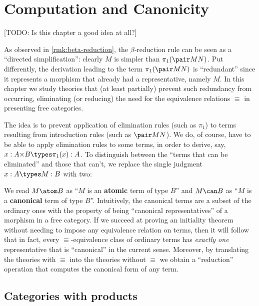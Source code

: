 \chapter{Computation and Canonicity}
\label{cha:canonical}

[TODO: Is this chapter a good idea at all?]

As observed in \cref{rmk:beta-reduction}, the $\beta$-reduction rule can be seen as a ``directed simplification'': clearly $M$ is simpler than $\pi_1(\pair M N)$.
Put differently, the derivation leading to the term $\pi_1(\pair M N)$ is ``redundant'' since it represents a morphism that already had a representative, namely $M$.
In this chapter we study theories that (at least partially) prevent such redundancy from occurring, eliminating (or reducing) the need for the equivalence relations $\equiv$ in presenting free categories.

The idea is to prevent application of elimination rules (such as $\pi_1$) to terms resulting from introduction rules (such as $\pair M N$).
We do, of course, have to be able to apply elimination rules to some terms, in order to derive, say, $x:A\times B \types \pi_1(x):A$.
To distinguish between the ``terms that can be eliminated'' and those that can't, we replace the single judgment $x:A\types M:B$ with two:
We read $M\atom B$ as ``$M$ is an \textbf{atomic} term of type $B$'' and $M\can B$ as ``$M$ is a \textbf{canonical} term of type $B$''.
Intuitively, the canonical terms are a subset of the ordinary ones with the property of being ``canonical representatives'' of a morphism in a free category.
If we succeed at proving an initiality theorem without needing to impose any equivalence relation on terms, then it will follow that in fact, every $\equiv$-equivalence class of ordinary terms has \emph{exactly one} representative that is ``canonical'' in the current sense.
Moreover, by translating the theories with $\equiv$ into the theories without $\equiv$ we obtain a ``reduction'' operation that computes the canonical form of any term.


\section{Categories with products}
\label{sec:atomcan-catprod}

